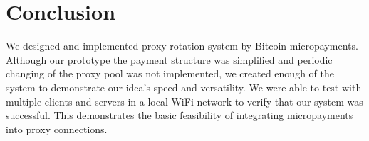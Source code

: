 \section{Conclusion}
\label{sec:conclusion}
We designed and implemented proxy rotation system by Bitcoin micropayments. Although our prototype the payment structure was simplified and periodic changing of the proxy pool was not implemented, we created enough of the system to demonstrate our idea's speed and versatility. We were able to test with multiple clients and servers in a local WiFi network to verify that our system was successful. This demonstrates the basic feasibility of integrating micropayments into proxy connections.